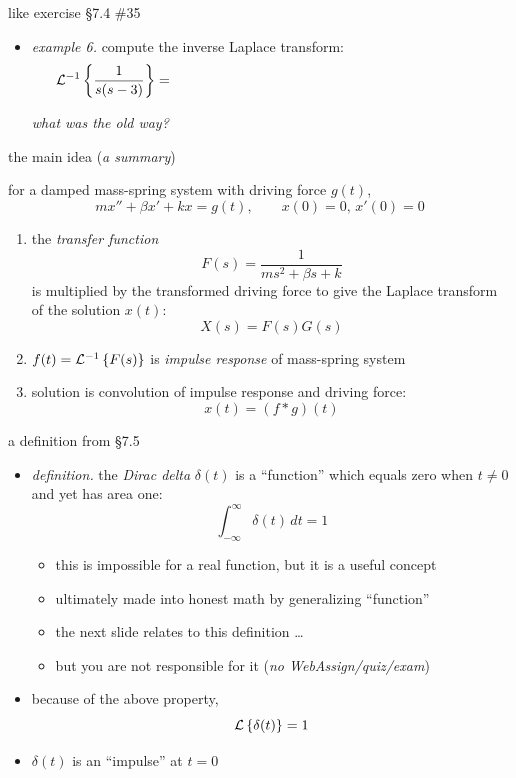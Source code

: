 \documentclass[urlcolor=blue,dvipsnames]{beamer}
\begin{document}
\begin{frame}{like exercise \S7.4 \#35}

\begin{itemize}
\item \emph{example 6.}  compute the inverse Laplace transform:
    $$\LLi{\frac{1}{s(s-3)}} = \hspace{80mm}$$

\vspace{40mm}
\hfill \scriptsize \emph{what was the old way?}
\end{itemize}
\end{frame}


\begin{frame}{the main idea (\emph{a summary})}

for a damped mass-spring system with driving force $g(t)$,
\begin{equation*}
m x'' + \beta x' + k x = g(t), \qquad x(0)=0, \, x'(0)=0
\end{equation*}

\begin{enumerate}
\item the \emph{transfer function}
    $$F(s) = \frac{1}{ms^2+\beta s+k}$$
is multiplied by the transformed driving force to give the Laplace transform of the solution $x(t)$:
    $$X(s) = F(s) G(s)$$
\item $f(t)=\mathcal{L}^{-1}\left\{F(s)\right\}$ is \emph{impulse response} of mass-spring system
\item solution is convolution of impulse response and driving force:
    $$x(t) = (f * g)(t)$$
\end{enumerate}
\end{frame}


\begin{frame}{a definition from \S7.5}
\begin{itemize}
\item \emph{definition.}  the \emph{Dirac delta} $\delta(t)$ is a ``function'' which equals zero when $t\ne 0$ and yet has area one:
    $$\int_{-\infty}^\infty \delta(t)\,dt = 1$$
    \vspace{-3mm}
    \begin{itemize}
    \item this is impossible for a real function, but it is a useful concept
    \item ultimately made into honest math by generalizing ``function''
    \item the next slide relates to this definition \dots
    \item but you are not responsible for it (\emph{no WebAssign/quiz/exam})
    \end{itemize}
\item because of the above property,
    $$\mathcal{L}\left\{\delta(t)\right\} = 1$$
\item $\delta(t)$ is an ``impulse'' at $t=0$
\end{itemize}
\end{frame}
\end{document}
